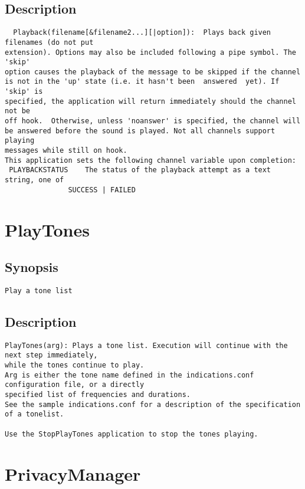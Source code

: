 \subsection{Description}
\begin{verbatim}
  Playback(filename[&filename2...][|option]):  Plays back given filenames (do not put
extension). Options may also be included following a pipe symbol. The 'skip'
option causes the playback of the message to be skipped if the channel
is not in the 'up' state (i.e. it hasn't been  answered  yet). If 'skip' is 
specified, the application will return immediately should the channel not be
off hook.  Otherwise, unless 'noanswer' is specified, the channel will
be answered before the sound is played. Not all channels support playing
messages while still on hook.
This application sets the following channel variable upon completion:
 PLAYBACKSTATUS    The status of the playback attempt as a text string, one of
               SUCCESS | FAILED

\end{verbatim}


\section{PlayTones}
\subsection{Synopsis}
\begin{verbatim}
Play a tone list
\end{verbatim}
\subsection{Description}
\begin{verbatim}
PlayTones(arg): Plays a tone list. Execution will continue with the next step immediately,
while the tones continue to play.
Arg is either the tone name defined in the indications.conf configuration file, or a directly
specified list of frequencies and durations.
See the sample indications.conf for a description of the specification of a tonelist.

Use the StopPlayTones application to stop the tones playing. 

\end{verbatim}


\section{PrivacyManager}
